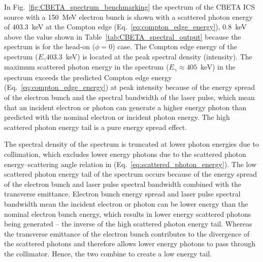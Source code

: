\documentclass[../main.tex]{subfiles}
\begin{document}
In Fig.~\ref{fig:CBETA_spectrum_benchmarking} the spectrum of the CBETA ICS source with a 150~\si{\mega\electronvolt} electron bunch is shown with a scattered photon energy of 403.3~\si{\kilo\electronvolt} at the Compton edge (Eq.~\ref{eq:compton_edge_energy}), 0.8~\si{\kilo\electronvolt} above the value shown in Table~\ref{tab:CBETA_spectral_output} because the spectrum is for the head-on ($\phi=0$) case. The Compton edge energy of the spectrum ($E_{\gamma}403.3$~\si{\kilo\electronvolt}) is located at the peak spectral density (intensity). The maximum scattered photon energy in the spectrum ($E_{\gamma}\approx405$~\si{\kilo\electronvolt}) in the spectrum exceeds the predicted Compton edge energy (Eq.~\ref{eq:compton_edge_energy}) at peak intensity because of the energy spread of the electron bunch and the spectral bandwidth of the laser pulse, which mean that an incident electron or photon can generate a higher energy photon than predicted with the nominal electron or incident photon energy. The high scattered photon energy tail is a pure energy spread effect.

The spectral density of the spectrum is truncated at lower photon energies due to collimation, which excludes lower energy photons due to the scattered photon energy--scattering angle relation in (Eq.~\ref{eq:scattered_photon_energy}). The low scattered photon energy tail of the spectrum occurs because of the energy spread of the electron bunch and laser pulse spectral bandwidth combined with the transverse emittance. Electron bunch energy spread and laser pulse spectral bandwidth mean the incident electron or photon can be lower energy than the nominal electron bunch energy, which results in lower energy scattered photons being generated -- the inverse of the high scattered photon energy tail. Whereas the transverse emittance of the electron bunch contributes to the divergence of the scattered photons and therefore allows lower energy photons to pass through the collimator. Hence, the two combine to create a low energy tail.
\end{document}
